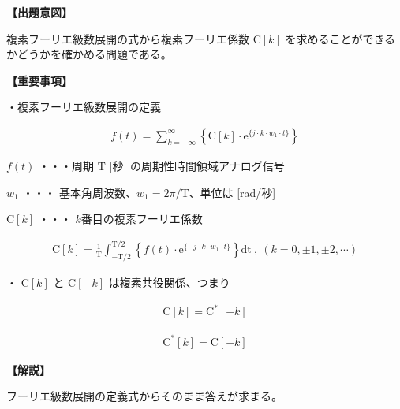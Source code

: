 \noindent \textbf{【出題意図】}

\bigskip
\noindent 複素フーリエ級数展開の式から複素フーリエ係数 $\textrm{C}[k]$ を求めることができるかどうかを確かめる問題である。

\vspace{1em}
\noindent \textbf{【重要事項】}

\medskip
\noindent ・複素フーリエ級数展開の定義

\begin{align*}
f(t) = \sum_{k = -\infty}^{\infty} 
\left \{
\textrm{C}[k] \cdot \textrm{e}^{\{j \cdot k \cdot w_1 \cdot t \}}
\right \}
\end{align*}

\medskip
\noindent $f(t)$ ・・・周期 $\textrm{T}$ [秒] の周期性時間領域アナログ信号

\medskip
\noindent $w_1$ ・・・ 基本角周波数、$w_1 = 2\pi/\textrm{T}$、単位は [rad/秒]

\medskip
\noindent $\textrm{C}[k]$ ・・・ $k$番目の複素フーリエ係数

\begin{align*}
\textrm{C}[k] = \frac{1}{\textrm{T}} \int_{-\textrm{T}/2}^{\textrm{T}/2} 
\left \{
f(t) \cdot \textrm{e}^{\{-j \cdot k \cdot w_1 \cdot t \}} 
\right \}
\textrm{dt}
\ ,\  (k = 0, \pm 1, \pm 2, \cdots)
\end{align*}

\bigskip
\noindent ・ $\textrm{C}[k]$ と $\textrm{C}[-k]$ は複素共役関係、つまり

\begin{align*}
\textrm{C}[k] = \textrm{C}^{*}[-k]
\end{align*}

\begin{align*}
\textrm{C}^{*}[k] = \textrm{C}[-k]
\end{align*}

\bigskip

\vspace{1em}
\noindent \textbf{【解説】}

\bigskip
\noindent フーリエ級数展開の定義式からそのまま答えが求まる。
